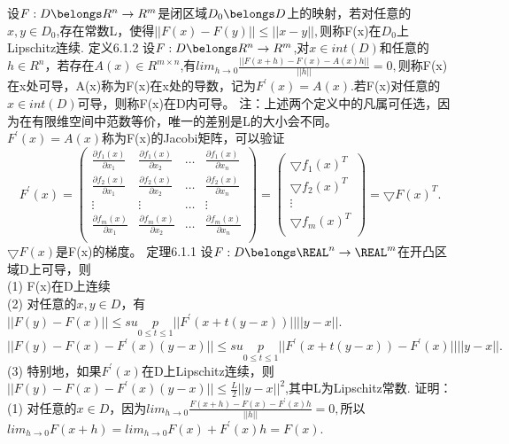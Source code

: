 \documentclass[a4paper,12pt]{article}
\begin{document}
\begin{CJK*}{UTF8}{gbsn}
	设$F:D\belongs R^n\rightarrow R^m$是闭区域$D_0\belongs D$上的映射，若对任意的$x,y\in D_0$,存在常数L，使得$||F(x)-F(y)||\le||x-y||,$则称F(x)在$D_0$上Lipschitz连续.
	定义6.1.2 设$F:D\belongs R^n\rightarrow R^m$,对$x\in int(D)$和任意的$h \in R^n$，若存在$A(x)\in R^{m\times n}$,有$lim_{h\rightarrow 0}\frac{||F(x+h)-F(x)-A(x)h||}{||h||}=0,$则称F(x)在x处可导，A(x)称为F(x)在x处的导数，记为$F^'(x)=A(x)$.若F(x)对任意的$x\in int(D)$可导，则称F(x)在D内可导。
	注：上述两个定义中的凡属可任选，因为在有限维空间中范数等价，唯一的差别是L的大小会不同。\\
	$F^'(x)=A(x)$称为F(x)的Jacobi矩阵，可以验证
	\begin{equation}
		F^'(x) = (
		\begin{array}{cccc}
			\frac{\partial f_1(x)}{\partial x_1} & \frac{\partial f_1(x)}{\partial x_2} & \ldots & \frac{\partial f_1(x)}{\partial x_n} \\
			\frac{\partial f_2(x)}{\partial x_1} & \frac{\partial f_2(x)}{\partial x_2} & \ldots & \frac{\partial f_2(x)}{\partial x_n} \\
			\vdots & \vdots & \ldots & \vdots \\
			\frac{\partial f_m(x)}{\partial x_1} & \frac{\partial f_m(x)}{\partial x_2} & \ldots & \frac{\partial f_m(x)}{\partial x_n} \\
		\end{array}
		)
		=(
		\begin{array}{c}
			\bigtriangledown f_1(x)^T\\
			\bigtriangledown f_2(x)^T\\
			\vdots \\
			\bigtriangledown f_m(x)^T\\
		\end{array}
		)
		=\bigtriangledown F(x)^T.
	\end{equation}
	$\bigtriangledown F(x)$是F(x)的梯度。
	定理6.1.1 设$F:D\belongs \REAL^n \rightarrow \REAL^m$在开凸区域D上可导，则\\
	(1) F(x)在D上连续\\
	(2) 对任意的$x,y\in D$，有$||F(y)-F(x)||\leq sup\limits_{0\leq t\leq 1}||F^'(x+t(y-x))||||y-x||$.
	$||F(y)-F(x)-F^'(x)(y-x)||\leq sup\limits_{0\leq t\leq 1}||F^'(x+t(y-x))-F^'(x)||||y-x||.$\\
	(3) 特别地，如果$F^'(x)$在D上Lipschitz连续，则$||F(y)-F(x)-F^'(x)(y-x)||\leq \frac{L}{2}||y-x||^2$,其中L为Lipschitz常数.
	证明：(1) 对任意的$x\in D$，因为$lim_{h\rightarrow 0}\frac{F(x+h)-F(x)-F^'(x)h}{||h||}=0,$所以$lim_{h\rightarrow 0}F(x+h) = lim_{h\rightarrow 0}F(x) + F^'(x)h = F(x).$

\end{CJK*}
\end{document}
